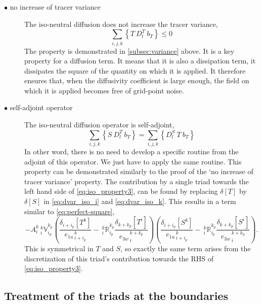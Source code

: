 \documentclass[../main/NEMO_manual]{subfiles}
\begin{document}
\begin{description}
\item[$\bullet$ no increase of tracer variance]
  The iso-neutral diffusion does not increase the tracer variance, \ie
  \[
    \sum_{i,j,k} \left\{ T \ D_l^T      \ b_T \right\} \leq 0
  \]
  The property is demonstrated in \autoref{subsec:variance} above.
  It is a key property for a diffusion term.
  It means that it is also a dissipation term,
  \ie it dissipates the square of the quantity on which it is applied.
  It therefore ensures that, when the diffusivity coefficient is large enough,
  the field on which it is applied becomes free of grid-point noise.

\item[$\bullet$ self-adjoint operator]
  The iso-neutral diffusion operator is self-adjoint, \ie
  \begin{equation}
    \label{eq:iso_property3}
    \sum_{i,j,k} \left\{ S \ D_l^T \ b_T \right\} = \sum_{i,j,k} \left\{ D_l^S \ T \ b_T \right\}
  \end{equation}
  In other word, there is no need to develop a specific routine from the adjoint of this operator.
  We just have to apply the same routine.
  This property can be demonstrated similarly to the proof of the `no increase of tracer variance' property.
  The contribution by a single triad towards the left hand side of \autoref{eq:iso_property3},
  can be found by replacing $\delta[T]$ by $\delta[S]$ in \autoref{eq:dvar_iso_i} and \autoref{eq:dvar_iso_k}.
  This results in a term similar to \autoref{eq:perfect-square},
  \[
    - {A}_i^k{\:} _i^k\mathbb{V}_{i_p}^{k_p}
    \left(
      \frac{ \delta_{i+ i_p}[T^k] }{ {e_{1u}}_{\,i + i_p}^{\,k} }
      -{\:}_i^k\mathbb{R}_{i_p}^{k_p}
      \frac{ \delta_{k+k_p} [T^i] }{{e_{3w}}_{\,i}^{\,k+k_p} }
    \right)
    \left(
      \frac{ \delta_{i+ i_p}[S^k] }{ {e_{1u}}_{\,i + i_p}^{\,k} }
      -{\:}_i^k\mathbb{R}_{i_p}^{k_p}
      \frac{ \delta_{k+k_p} [S^i] }{{e_{3w}}_{\,i}^{\,k+k_p} }
    \right).
  \]
This is symmetrical in $T $ and $S$, so exactly the same term arises from
the discretization of this triad's contribution towards the RHS of \autoref{eq:iso_property3}.
\end{description}

\subsection{Treatment of the triads at the boundaries}
\label{sec:iso_bdry}
\end{document}
